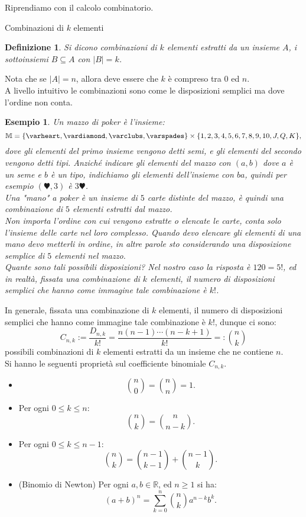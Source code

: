 \documentclass[11pt]{book}
\theoremstyle{Definizione}
\newtheorem*{mydef}{Definizione}
\theoremstyle{TeoremaProposizioneLemmaCorollario}
\theoremstyle{OsservazioneNota}
\newtheorem{myes}{Esempio}[section]
\newcommand{\R}{\mathbb{R}}
\newcommand{\mazzo}{\mathbb{M}}
\newcommand{\cuori}{\varheart}
\newcommand{\quadri}{\vardiamond}
\newcommand{\fiori}{\varclubs}
\newcommand{\picche}{\varspades}
\begin{document}
Riprendiamo con il calcolo combinatorio.
\begin{boxdef}{Combinazioni di $k$ elementi}
\begin{mydef}
Si dicono combinazioni di $k$ elementi estratti da un insieme $A$, i sottoinsiemi $B \subseteq A$ con $|B| = k$.
\end{mydef}
\end{boxdef}
\noindent
Nota che se $|A| = n$, allora deve essere che $k$ è compreso tra $0$ ed $n$.\\
A livello intuitivo le combinazioni sono come le disposizioni semplici ma dove l'ordine non conta.
\begin{myes}
Un mazzo di poker è l'insieme:
$$
\mazzo = \{\cuori,\quadri,\fiori,\picche\} \times \{1,2,3,4,5,6,7,8,9,10,J,Q,K\},
$$
dove gli elementi del primo insieme vengono detti semi, e gli elementi del secondo vengono detti tipi. Anziché indicare gli elementi del mazzo con $(a,b)$ dove $a$ è un seme e $b$ è un tipo, indichiamo gli elementi dell'insieme con $ba$, quindi per esempio $(\cuori,3)$ è $3\cuori$.\\
Una "mano" a poker è un insieme di $5$ carte distinte del mazzo, è quindi una combinazione di $5$ elementi estratti dal mazzo.\\
Non importa l'ordine con cui vengono estratte o elencate le carte, conta solo l'insieme delle carte nel loro complesso. Quando devo elencare gli elementi di una mano devo metterli in ordine, in altre parole sto considerando una disposizione semplice di $5$ elementi nel mazzo.\\
Quante sono tali possibili disposizioni? Nel nostro caso la risposta è $120 = 5!$, ed in realtà, fissata una combinazione di $k$ elementi, il numero di disposizioni semplici che hanno come immagine tale combinazione è $k!$. 
\end{myes}
In generale, fissata una combinazione di $k$ elementi, il numero di disposizioni semplici che hanno come immagine tale combinazione è $k!$, dunque ci sono:
$$
C_{n,k}:= \frac{D_{n,k}}{k!} = \frac{n(n-1)\cdots(n-k+1)}{k!} =: \binom{n}{k}
$$
possibili combinazioni di $k$ elementi estratti da un insieme che ne contiene $n$.\\
Si hanno le seguenti proprietà sul coefficiente binomiale $C_{n,k}$.
\begin{itemize}
\item 
$$
\binom{n}{0} = \binom{n}{n} = 1.
$$
\item Per ogni $0\leq k \leq n$:
$$
\binom{n}{k} = \binom{n}{n-k}.
$$
\item Per ogni $0\leq k \leq n-1$:
$$
\binom{n}{k} = \binom{n-1}{k-1} + \binom{n-1}{k}.
$$
\item (Binomio di Newton) Per ogni $a,b\in \R$, ed $n\geq 1$ si ha:
$$
(a+b)^n = \sum_{k = 0}^n \binom{n}{k}a^{n-k}b^k.
$$
\end{itemize}
\end{document}
